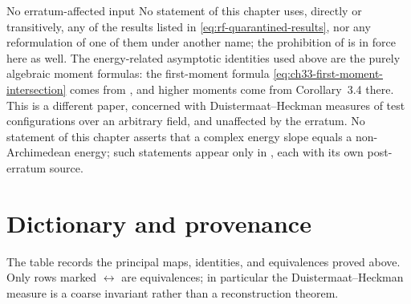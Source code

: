 \begin{warning}{No erratum-affected input}
\label{warn:ch33-erratum-firewall}
No statement of this chapter uses, directly or transitively, any of the
results listed in \eqref{eq:rf-quarantined-results}, nor any reformulation
of one of them under another name; the prohibition of
 is in force here as well.  The energy-related
asymptotic identities used above are the purely algebraic moment formulas: the first-moment formula
\eqref{eq:ch33-first-moment-intersection} comes from
\cite[Proposition~3.12(iii)]{BHJ17}, and higher moments come from
Corollary~3.4 there.  This is a different paper, concerned with
Duistermaat--Heckman measures of test configurations over an arbitrary
field, and unaffected by the erratum.  No statement of this chapter asserts
that a complex energy slope equals a non-Archimedean energy; such
statements appear only in , each with its own
post-erratum source.
\end{warning}

\section{Dictionary and provenance}
\label{sec:ch33-dictionary}

The table records the principal maps, identities, and equivalences proved
above.  Only rows marked $\longleftrightarrow$ are equivalences; in
particular the Duistermaat--Heckman measure is a coarse invariant rather
than a reconstruction theorem.

